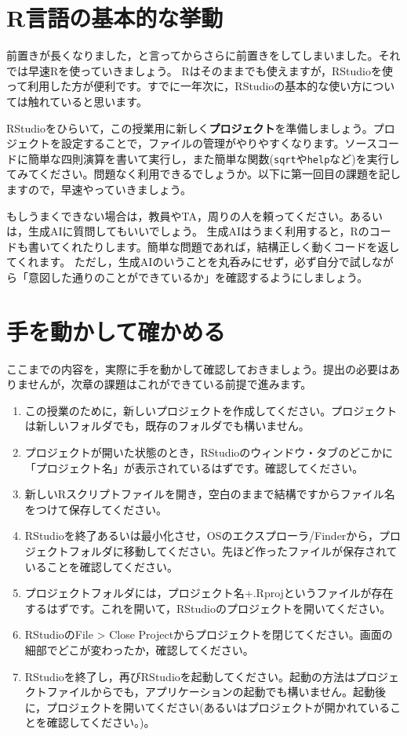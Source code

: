 \documentclass{ltjsbook}
\begin{document}
\section{R言語の基本的な挙動}
前置きが長くなりました，と言ってからさらに前置きをしてしまいました。それでは早速Rを使っていきましょう。
Rはそのままでも使えますが，RStudioを使って利用した方が便利です。すでに一年次に，RStudioの基本的な使い方については触れていると思います。

RStudioをひらいて，この授業用に新しく\textbf{プロジェクト}を準備しましょう\label{UnderProject}。プロジェクトを設定することで，ファイルの管理がやりやすくなります。ソースコードに簡単な四則演算を書いて実行し，また簡単な関数(\verb|sqrt|や\verb|help|など)を実行してみてください。問題なく利用できるでしょうか。以下に第一回目の課題を記しますので，早速やっていきましょう。

もしうまくできない場合は，教員やTA，周りの人を頼ってください。あるいは，生成AIに質問してもいいでしょう。
生成AIはうまく利用すると，Rのコードも書いてくれたりします。簡単な問題であれば，結構正しく動くコードを返してくれます。
ただし，生成AIのいうことを丸呑みにせず，必ず自分で試しながら「意図した通りのことができているか」を確認するようにしましょう。
\section{手を動かして確かめる}
ここまでの内容を，実際に手を動かして確認しておきましょう。提出の必要はありませんが，次章の課題はこれができている前提で進みます。
\begin{enumerate}
	\item この授業のために，新しいプロジェクトを作成してください。プロジェクトは新しいフォルダでも，既存のフォルダでも構いません。
	\item プロジェクトが開いた状態のとき，RStudioのウィンドウ・タブのどこかに「プロジェクト名」が表示されているはずです。確認してください。
	\item 新しいRスクリプトファイルを開き，空白のままで結構ですからファイル名をつけて保存してください。
	\item RStudioを終了あるいは最小化させ，OSのエクスプローラ/Finderから，プロジェクトフォルダに移動してください。先ほど作ったファイルが保存されていることを確認してください。
	\item プロジェクトフォルダには，プロジェクト名+.Rprojというファイルが存在するはずです。これを開いて，RStudioのプロジェクトを開いてください。
	\item RStudioのFile > Close Projectからプロジェクトを閉じてください。画面の細部でどこが変わったか，確認してください。
	\item RStudioを終了し，再びRStudioを起動してください。起動の方法はプロジェクトファイルからでも，アプリケーションの起動でも構いません。起動後に，プロジェクトを開いてください(あるいはプロジェクトが開かれていることを確認してください。)。
\end{enumerate}
\end{document}
